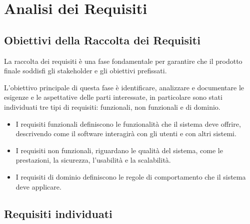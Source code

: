 \chapter{Analisi dei Requisiti}

\section{Obiettivi della Raccolta dei Requisiti}
La raccolta dei requisiti è una fase fondamentale per garantire che il prodotto finale soddisfi gli stakeholder e gli obiettivi prefissati.

L'obiettivo principale di questa fase è identificare, analizzare e documentare le esigenze e le aspettative delle parti interessate, in particolare sono stati individuati tre tipi di requisiti: funzionali, non funzionali e di dominio.
\begin{itemize}
	\item I requisiti funzionali definiscono le funzionalità che il sistema deve offrire, descrivendo come il software interagirà con gli utenti e con altri sistemi.
	\item I requisiti non funzionali, riguardano le qualità del sistema, come le prestazioni, la sicurezza, l'usabilità e la scalabilità.
	\item I requisiti di dominio definiscono le regole di comportamento che il sistema deve applicare.
\end{itemize}

\newpage

\section{Requisiti individuati}
